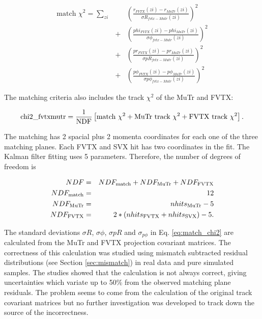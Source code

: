 \documentclass[12pt]{article}
\begin{document}
\begin{eqnarray}
\label{eq:match_chi2}
	\textrm {match } \chi^2 = \sum_{zi} && \left(\frac{r_{FVTX}(zi)-r_{MuTr}(zi)}{\sigma R_{fvtx-Mutr}(zi)}\right)^2\\\nonumber
	&+& \left(\frac{phi_{FVTX}(zi)-phi_{MuTr}(zi)}{\sigma\phi_{fvtx-Mutr}(zi)}\right)^2\\\nonumber
	&+& \left(\frac{pr_{FVTX}(zi)-pr_{MuTr}(zi)}{\sigma pR_{fvtx-Mutr}(zi)}\right)^2\\\nonumber
	&+& \left(\frac{p\phi_{FVTX}(zi)-p\phi_{MuTr}(zi)}{\sigma p\phi_{fvtx-Mutr}(zi)}\right)^2
\end{eqnarray}

The matching criteria also includes the track $\chi^2$ of the MuTr and FVTX:

\begin{equation}
\textrm{chi2\_fvtxmutr} = \frac{1}{\rm NDF} \left[ \textrm{match } \chi^2 + \textrm{MuTr track } \chi^2 + \textrm{FVTX track } \chi^2 \right].
\end{equation}

The matching has 2 spacial plus 2 momenta coordinates for each one of the three matching planes. Each FVTX and SVX hit has two coordinates in the fit. The Kalman filter 
fitting uses 5 parameters. Therefore, the number of degrees of freedom is

\begin{eqnarray}
	NDF &=& NDF_{\rm match} + NDF_{\rm MuTr} + NDF_{\rm FVTX}\\\nonumber
	NDF_{\rm match} &=& 12\\\nonumber
	NDF_{\rm MuTr} &=& nhits_{\rm MuTr} - 5\\\nonumber
	NDF_{\rm FVTX} &=& 2*(nhits_{\rm FVTX} + nhits_{\rm SVX}) -5.
\end{eqnarray}

The standard deviations $\sigma R$, $\sigma \phi$, $\sigma pR$ and $\sigma_{p\phi}$ in Eq. \ref{eq:match_chi2} are calculated from the MuTr and FVTX projection covariant matrices. The 
correctness of this calculation was studied using mismatch subtracted residual distributions (see Section \ref{sec:mismatch}) in real data and pure simulated samples. The studies showed that 
the calculation is not always correct, giving uncertainties which variate up to 50\% from the observed matching plane residuals. The problem seems to come from the calculation of the original 
track covariant matrices but no further investigation was developed to track down the source of the incorrectness. 
\end{document}
